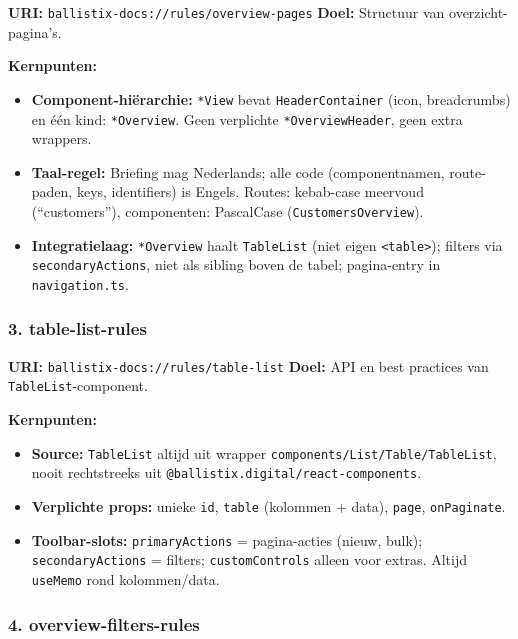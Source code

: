 \noindent
\textbf{URI:} \texttt{ballistix-docs://rules/overview-pages} \newline
\textbf{Doel:} Structuur van overzicht-pagina's.

\noindent
\textbf{Kernpunten:}

\begin{itemize}
  \item \textbf{Component-hiërarchie:} \texttt{*View} bevat \texttt{HeaderContainer} (icon, breadcrumbs) en één kind: \texttt{*Overview}. Geen verplichte \texttt{*OverviewHeader}, geen extra wrappers.
  \item \textbf{Taal-regel:} Briefing mag Nederlands; alle code (componentnamen, route-paden, keys, identifiers) is Engels. Routes: kebab-case meervoud (``customers''), componenten: PascalCase (\texttt{CustomersOverview}).
  \item \textbf{Integratielaag:} \texttt{*Overview} haalt \texttt{TableList} (niet eigen \texttt{<table>}); filters via \texttt{secondaryActions}, niet als sibling boven de tabel; pagina-entry in \texttt{navigation.ts}.
\end{itemize}

\subsubsection{3. table-list-rules}

\noindent
\textbf{URI:} \texttt{ballistix-docs://rules/table-list} \newline
\textbf{Doel:} API en best practices van \texttt{TableList}-component.

\noindent
\textbf{Kernpunten:}

\begin{itemize}
  \item \textbf{Source:} \texttt{TableList} altijd uit wrapper \texttt{components/List/Table/TableList}, nooit rechtstreeks uit \texttt{@ballistix.digital/react-components}.
  \item \textbf{Verplichte props:} unieke \texttt{id}, \texttt{table} (kolommen + data), \texttt{page}, \texttt{onPaginate}.
  \item \textbf{Toolbar-slots:} \texttt{primaryActions} = pagina-acties (nieuw, bulk); \texttt{secondaryActions} = filters; \texttt{customControls} alleen voor extras. Altijd \texttt{useMemo} rond kolommen/data.
\end{itemize}

\subsubsection{4. overview-filters-rules}

